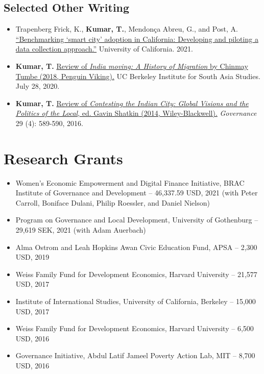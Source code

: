 \documentclass[11pt]{article}
\begin{document}
\subsection*{Selected Other Writing}	
\begin{itemize}
\item[]Trapenberg Frick, K., \textbf{Kumar, T.}, Mendon\c{c}a Abreu, G., and Post, A. \href{https://escholarship.org/uc/item/3797p0ws}{``Benchmarking `smart city' adoption in California: Developing and piloting a data collection approach.''} University of California. 2021. 



\item[]\textbf{Kumar, T.} \href{https://southasia.berkeley.edu/sites/default/files/shared/India_Center/India_Moving.pdf}{Review of \textit{India moving: A History of Migration} by Chinmay Tumbe (2018, Penguin Viking).}  UC Berkeley Institute for South Asia Studies. July 28, 2020.

\item[]\textbf{Kumar, T.} \href{http://onlinelibrary.wiley.com/doi/10.1111/gove.12241/abstract}{Review of \textit{Contesting the Indian City: Global Visions and the Politics of the Local}, ed. Gavin Shatkin (2014, Wiley-Blackwell).} \textit{Governance} 29 (4): 589-590, 2016. 



\end{itemize}


\vspace{2mm}
\color{MidnightBlue}

\section*{Research Grants}
\color{Black}
\begin{itemize}
\item[]Women's Economic Empowerment and Digital Finance Initiative, BRAC Institute of Governance and Development -- 46,337.59 USD, 2021 (with Peter Carroll, Boniface Dulani, Philip Roessler, and Daniel Nielson)

\item[] Program on Governance and Local Development, University of Gothenburg -- 29,619 SEK, 2021 (with Adam Auerbach)
\item[] Alma Ostrom and Leah Hopkins Awan Civic Education Fund, APSA -- 2,300 USD, 2019

\item[] Weiss Family Fund for Development Economics, Harvard University -- 21,577 USD, 2017


	 
\item[]Institute of International Studies, University of California, Berkeley -- 15,000 USD, 2017
\item[] Weiss Family Fund for Development Economics, Harvard University -- 6,500 USD, 2016 

\item[] Governance Initiative, Abdul Latif Jameel Poverty Action Lab, MIT -- 8,700 USD, 2016	
\end{itemize}
\end{document}
